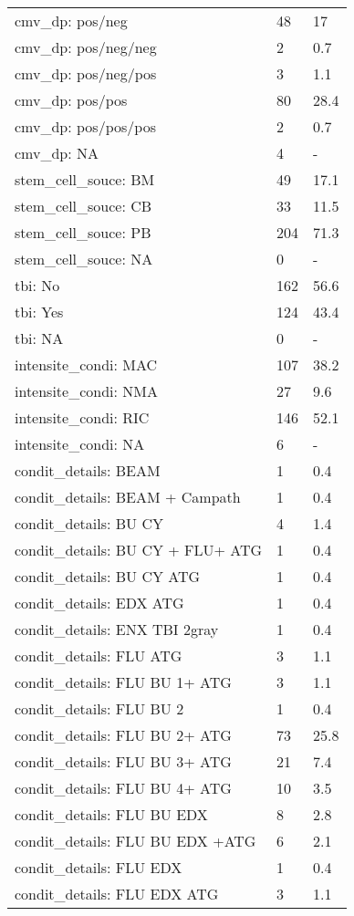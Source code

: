 \documentclass{article}
\begin{document}
\begin{longtable}{lll}
  cmv_dp: pos/neg & 48 & 17 \\ 
  cmv_dp: pos/neg/neg & 2 & 0.7 \\ 
  cmv_dp: pos/neg/pos & 3 & 1.1 \\ 
  cmv_dp: pos/pos & 80 & 28.4 \\ 
  cmv_dp: pos/pos/pos & 2 & 0.7 \\ 
  cmv_dp: NA & 4 & - \\ 
  stem_cell_souce: BM & 49 & 17.1 \\ 
  stem_cell_souce: CB & 33 & 11.5 \\ 
  stem_cell_souce: PB & 204 & 71.3 \\ 
  stem_cell_souce: NA & 0 & - \\ 
  tbi: No & 162 & 56.6 \\ 
  tbi: Yes & 124 & 43.4 \\ 
  tbi: NA & 0 & - \\ 
  intensite_condi: MAC & 107 & 38.2 \\ 
  intensite_condi: NMA & 27 & 9.6 \\ 
  intensite_condi: RIC & 146 & 52.1 \\ 
  intensite_condi: NA & 6 & - \\ 
  condit_details: BEAM & 1 & 0.4 \\ 
  condit_details: BEAM + Campath & 1 & 0.4 \\ 
  condit_details: BU CY  & 4 & 1.4 \\ 
  condit_details: BU CY + FLU+ ATG & 1 & 0.4 \\ 
  condit_details: BU CY ATG & 1 & 0.4 \\ 
  condit_details: EDX ATG & 1 & 0.4 \\ 
  condit_details: ENX TBI 2gray & 1 & 0.4 \\ 
  condit_details: FLU ATG & 3 & 1.1 \\ 
  condit_details: FLU BU 1+ ATG & 3 & 1.1 \\ 
  condit_details: FLU BU 2 & 1 & 0.4 \\ 
  condit_details: FLU BU 2+ ATG & 73 & 25.8 \\ 
  condit_details: FLU BU 3+ ATG & 21 & 7.4 \\ 
  condit_details: FLU BU 4+ ATG & 10 & 3.5 \\ 
  condit_details: FLU BU EDX & 8 & 2.8 \\ 
  condit_details: FLU BU EDX +ATG & 6 & 2.1 \\ 
  condit_details: FLU EDX & 1 & 0.4 \\ 
  condit_details: FLU EDX ATG & 3 & 1.1 \\ 

\end{longtable}
\end{document}
